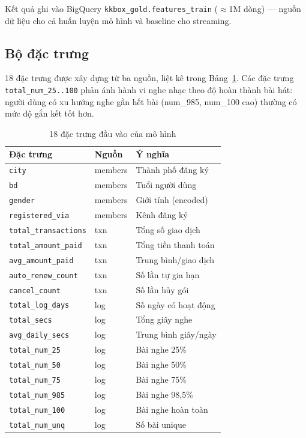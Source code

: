 \documentclass[conference]{IEEEtran}
\begin{document}
Kết quả ghi vào BigQuery \texttt{kkbox\_gold.features\_train} ($\approx$1M
dòng) — nguồn dữ liệu cho cả huấn luyện mô hình và baseline cho streaming.

\subsection{Bộ đặc trưng}

18 đặc trưng được xây dựng từ ba nguồn, liệt kê trong Bảng~\ref{tab:features}.
Các đặc trưng \texttt{total\_num\_25..100} phản ánh hành vi nghe nhạc theo
độ hoàn thành bài hát: người dùng có xu hướng nghe gần hết bài (num\_985,
num\_100 cao) thường có mức độ gắn kết tốt hơn.

\begin{table}[htbp]
\caption{18 đặc trưng đầu vào của mô hình}
\label{tab:features}
\centering
\begin{tabular}{p{3.2cm}lp{3.5cm}}
\toprule
\textbf{Đặc trưng} & \textbf{Nguồn} & \textbf{Ý nghĩa} \\
\midrule
\texttt{city}              & members & Thành phố đăng ký \\
\texttt{bd}                & members & Tuổi người dùng \\
\texttt{gender}            & members & Giới tính (encoded) \\
\texttt{registered\_via}   & members & Kênh đăng ký \\
\midrule
\texttt{total\_transactions}  & txn & Tổng số giao dịch \\
\texttt{total\_amount\_paid}  & txn & Tổng tiền thanh toán \\
\texttt{avg\_amount\_paid}    & txn & Trung bình/giao dịch \\
\texttt{auto\_renew\_count}   & txn & Số lần tự gia hạn \\
\texttt{cancel\_count}        & txn & Số lần hủy gói \\
\midrule
\texttt{total\_log\_days}  & log & Số ngày có hoạt động \\
\texttt{total\_secs}       & log & Tổng giây nghe \\
\texttt{avg\_daily\_secs}  & log & Trung bình giây/ngày \\
\texttt{total\_num\_25}    & log & Bài nghe 25\% \\
\texttt{total\_num\_50}    & log & Bài nghe 50\% \\
\texttt{total\_num\_75}    & log & Bài nghe 75\% \\
\texttt{total\_num\_985}   & log & Bài nghe 98,5\% \\
\texttt{total\_num\_100}   & log & Bài nghe hoàn toàn \\
\texttt{total\_num\_unq}   & log & Số bài unique \\
\bottomrule
\end{tabular}
\end{table}
\end{document}
